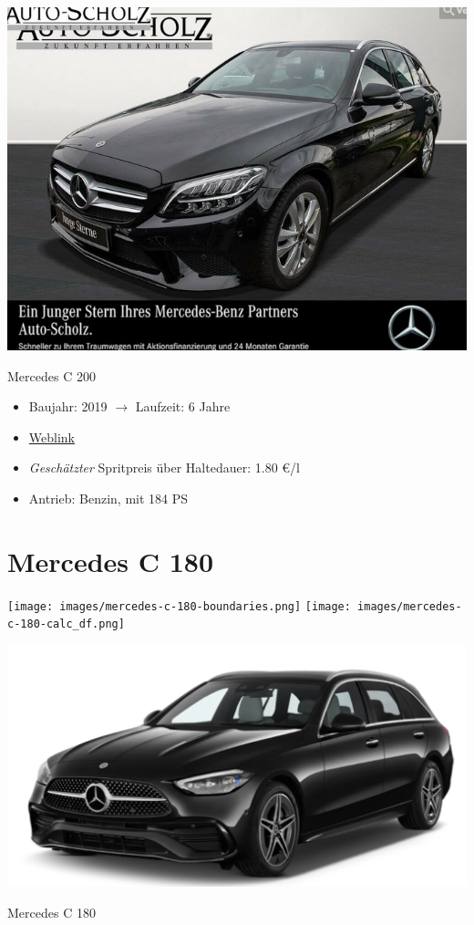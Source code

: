 \documentclass[landscape, DIV=99, 14pt]{scrartcl}
\begin{document}
\pagebreak
\null
\vspace{2cm}
\begin{center}
\includegraphics[width=0.9\columnwidth]{cars/mercedes-c-200-t.png}

Mercedes C 200
\end{center}

\begin{itemize}
    \item Baujahr: 2019 $\rightarrow$ Laufzeit: 6 Jahre
    \item \href{https://suchen.mobile.de/fahrzeuge/details.html?action=parkItem&id=327113608}{Weblink}
    \item \emph{Gesch\"atzter} Spritpreis \"uber Haltedauer: 1.80 \euro{}/l
    \item Antrieb: Benzin, mit 184 PS
\end{itemize}

\pagebreak


\twocolumn

\section*{Mercedes C 180}
\begin{center}
\texttt{[image: images/mercedes-c-180-boundaries.png]}
\null
\vspace{0.5cm}
\texttt{[image: images/mercedes-c-180-calc\_df.png]}
\end{center}

\pagebreak
\null
\vspace{2cm}
\begin{center}
\includegraphics[width=0.9\columnwidth]{cars/mercedes-c-180-t.png}

Mercedes C 180
\end{center}
\end{document}

